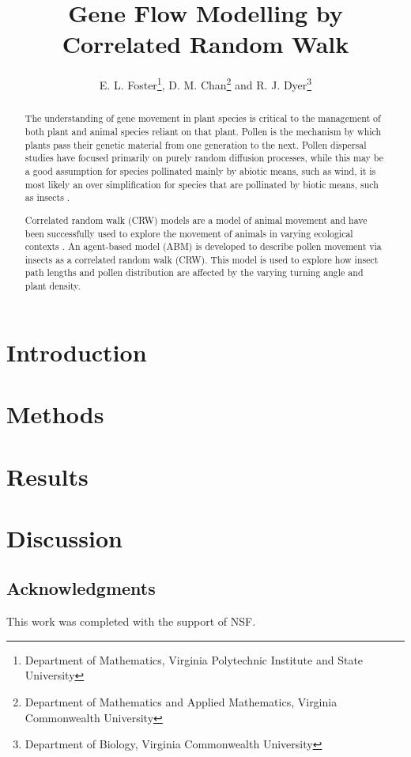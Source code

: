 \documentclass{article}
\title{Gene Flow Modelling by Correlated Random Walk}
\author{E. L. Foster\thanks{Department of Mathematics, Virginia Polytechnic Institute and State
University}, D. M. Chan\thanks{Department of Mathematics and Applied Mathematics, Virginia
Commonwealth University} and R. J. Dyer\thanks{Department of Biology, Virginia Commonwealth
University}}
\begin{document}
\maketitle

\begin{abstract} 
  The understanding of gene movement in plant species is critical to the management
  of both plant and animal species reliant on that plant.  Pollen is the mechanism by which plants
  pass their genetic material from one generation to the next. Pollen dispersal studies have focused
  primarily on purely random diffusion processes, while this may be a good assumption for species
  pollinated mainly by abiotic means, such as wind, it is most likely an over simplification for
  species that are pollinated by biotic means, such as insects \cite{Chan}.

  Correlated random walk (CRW) models are a model of animal movement \cite{Prasad05} and have been
  successfully used to explore the movement of animals in varying ecological contexts
  \cite{Bartumeus07}. An agent-based model (ABM) is developed to describe pollen movement via insects
  as a correlated random walk (CRW). This model is used to explore how insect path lengths and pollen
  distribution are affected by the varying turning angle and plant density.  
\end{abstract}

\section{Introduction}
  
\section{Methods}
  
\section{Results}
  
\section{Discussion}
  
\subsection*{Acknowledgments}
This work was completed with the support of NSF.


\end{document}

